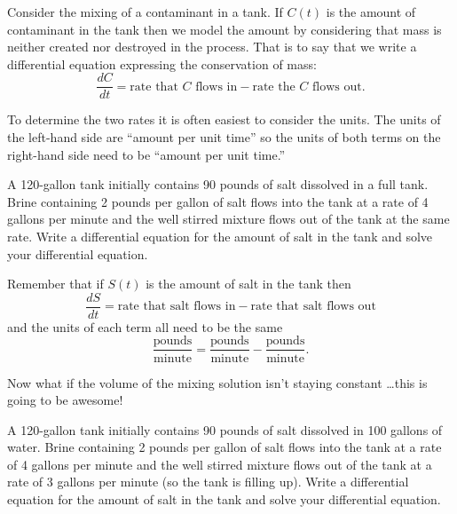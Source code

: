\begin{technique}
    Consider the mixing of a contaminant in a
    tank.  If $C(t)$ is the amount of contaminant in the tank then we model the amount by
    considering that mass is neither created nor destroyed in the process.  That is to say
    that we write a differential equation expressing the conservation of mass:
    \[ \frac{dC}{dt} = \text{rate that $C$ flows in} - \text{rate the $C$ flows out}. \]

    To determine the two rates it is often easiest to consider the units.  The units of
    the left-hand side are ``amount per unit time'' so the units of both terms on the
    right-hand side need to be ``amount per unit time.''
\end{technique}
\begin{problem}
    A 120-gallon tank initially contains 90 pounds of salt dissolved in a full tank.
    Brine containing 2 pounds per gallon of salt flows into the tank at a rate of 4
    gallons per minute and the well stirred mixture flows out of the tank at the same
    rate.  Write a differential equation for the amount of salt in the tank and solve your
    differential equation.

    Remember that if $S(t)$ is the amount of salt in the tank then
    \[ \frac{dS}{dt} = \text{rate that salt flows in} - \text{rate that salt flows out} \]
    and the units of each term all need to be the same
    \[ \frac{\text{pounds}}{\text{minute}} = \frac{\text{pounds}}{\text{minute}} -
        \frac{\text{pounds}}{\text{minute}}. \]
\end{problem}
\solution{
    \[ \frac{dS}{dt} = 4(2) - \frac{4S}{120} \quad \text{with} \quad S(0) = 90. \]
    \[ \frac{dS}{dt} = -\frac{4}{120} \left( S - 8\left( \frac{120}{4} \right) \right) \]
    \[ S(t) = -150 e^{-4t/120} + 240 \]
}

Now what if the volume of the mixing solution isn't staying constant \ldots this is going
to be awesome!
\begin{problem}
    A 120-gallon tank initially contains 90 pounds of salt dissolved in 100 gallons of
    water.  Brine containing 2 pounds per gallon of salt flows into the tank at a rate of
    4 gallons per minute and the well stirred mixture flows out of the tank at a rate of 3
    gallons per minute (so the tank is filling up).  Write a differential equation for the
    amount of salt in the tank and solve your differential equation. 
\end{problem}


